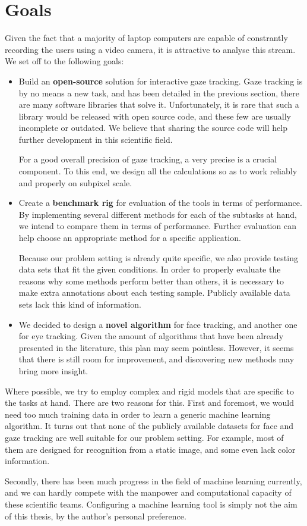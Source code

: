\chapter{Goals}

Given the fact that a majority of laptop computers are capable of constrantly recording the users using a video camera, it is attractive to analyse this stream.
We set off to the following goals:
\begin{itemize}

\item Build an \textbf{open-source} solution for interactive gaze tracking.
Gaze tracking is by no means a new task, and has been detailed in the previous section, there are many software libraries that solve it.
Unfortunately, it is rare that such a library would be released with open source code, and these few are usually incomplete or outdated.
We believe that sharing the source code will help further development in this scientific field.

For a good overall precision of gaze tracking, a very precise is a crucial component.
To this end, we design all the calculations so as to work reliably and properly on subpixel scale.

\item Create a \textbf{benchmark rig} for evaluation of the tools in terms of performance.
By implementing several different methods for each of the subtasks at hand, we intend to compare them in terms of performance.
Further evaluation can help choose an appropriate method for a specific application.

Because our problem setting is already quite specific, we also provide testing data sets that fit the given conditions.
In order to properly evaluate the reasons why some methods perform better than others, it is necessary to make extra annotations about each testing sample.
Publicly available data sets lack this kind of information.

\item We decided to design a \textbf{novel algorithm} for face tracking, and another one for eye tracking.
Given the amount of algorithms that have been already presented in the literature, this plan may seem pointless.
However, it seems that there is still room for improvement, and discovering new methods may bring more insight.

\end{itemize}

Where possible, we try to employ complex and rigid models that are specific to the tasks at hand.
There are two reasons for this.
First and foremost, we would need too much training data in order to learn a generic machine learning algorithm.
It turns out that none of the publicly available datasets for face and gaze tracking are well suitable for our problem setting.
For example, most of them are designed for recognition from a static image, and some even lack color information.

Secondly, there has been much progress in the field of machine learning currently, and we can hardly compete with the manpower and computational capacity of these scientific teams.
Configuring a machine learning tool is simply not the aim of this thesis, by the author's personal preference.
